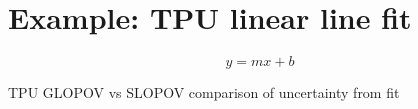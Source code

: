 \section{Example: TPU linear line fit}
\[
y = mx+b
\]

TPU GLOPOV vs SLOPOV comparison of uncertainty from fit